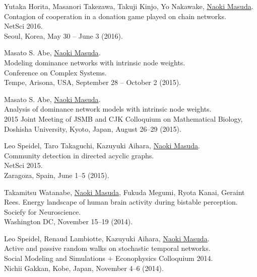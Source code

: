\documentclass[11pt,letter]{article}
\begin{document}
\begin{etaremune}
\item Yutaka Horita, Masanori Takezawa, Takuji Kinjo, Yo Nakawake, \underline{Naoki Masuda}.\\
Contagion of cooperation in a donation game played on chain networks.\\
NetSci 2016.\\
Seoul, Korea, May 30 -- June 3 (2016).

\item Masato S. Abe, \underline{Naoki Masuda}.\\
Modeling dominance networks with intrinsic node weights.\\
Conference on Complex Systems.\\
Tempe, Arisona, USA, September 28 -- October 2 (2015).

\item Masato S. Abe, \underline{Naoki Masuda}.\\
Analysis of dominance network models with intrinsic node weights.\\
2015 Joint Meeting of JSMB and CJK Colloquium on Mathematical Biology, Doshisha University, Kyoto, Japan, August 26--29 (2015).

\item Leo Speidel, Taro Takaguchi, Kazuyuki Aihara, \underline{Naoki Masuda}.\\
Community detection in directed acyclic graphs.\\
NetSci 2015.\\
Zaragoza, Spain, June 1--5 (2015).

\item Takamitsu Watanabe, \underline{Naoki Masuda}, Fukuda Megumi, Ryota Kanai, Geraint Rees.
Energy landscape of human brain activity during bistable perception.\\
Sociefy for Neuroscience.\\
Washington DC, November 15--19 (2014).

\item Leo Speidel, Renaud Lambiotte, Kazuyuki Aihara, \underline{Naoki Masuda}.\\
Active and passive random walks on stochastic temporal networks.\\
Social Modeling and Simulations $+$ Econophysics Colloquium 2014.\\
Nichii Gakkan, Kobe, Japan, November 4--6 (2014).


\end{etaremune}
\end{document}
